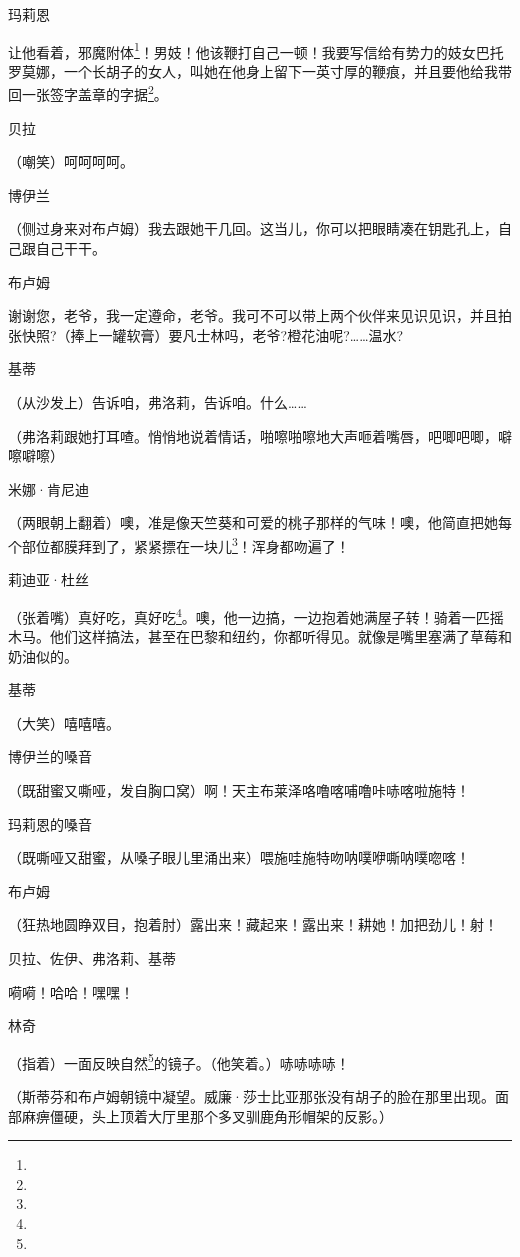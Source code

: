 \par 玛莉恩
\par 让他看着，邪魔附体\footnote{}！男妓！他该鞭打自己一顿！我要写信给有势力的妓女巴托罗莫娜，一个长胡子的女人，叫她在他身上留下一英寸厚的鞭痕，并且要他给我带回一张签字盖章的字据\footnote{}。
\par 贝拉
\par （嘲笑）呵呵呵呵。
\par 博伊兰
\par （侧过身来对布卢姆）我去跟她干几回。这当儿，你可以把眼睛凑在钥匙孔上，自己跟自己干干。
\par 布卢姆
\par 谢谢您，老爷，我一定遵命，老爷。我可不可以带上两个伙伴来见识见识，并且拍张快照?（捧上一罐软膏）要凡士林吗，老爷?橙花油呢?……温水?
\par 基蒂
\par （从沙发上）告诉咱，弗洛莉，告诉咱。什么……
\par （弗洛莉跟她打耳喳。悄悄地说着情话，啪嚓啪嚓地大声咂着嘴唇，吧唧吧唧，噼嚓噼嚓）
\par 米娜·肯尼迪
\par （两眼朝上翻着）噢，准是像天竺葵和可爱的桃子那样的气味！噢，他简直把她每个部位都膜拜到了，紧紧摽在一块儿\footnote{}！浑身都吻遍了！
\par 莉迪亚·杜丝
\par （张着嘴）真好吃，真好吃\footnote{}。噢，他一边搞，一边抱着她满屋子转！骑着一匹摇木马。他们这样搞法，甚至在巴黎和纽约，你都听得见。就像是嘴里塞满了草莓和奶油似的。
\par 基蒂
\par （大笑）嘻嘻嘻。
\par 博伊兰的嗓音
\par （既甜蜜又嘶哑，发自胸口窝）啊！天主布莱泽咯噜喀哺噜咔哧喀啦施特！
\par 玛莉恩的嗓音
\par （既嘶哑又甜蜜，从嗓子眼儿里涌出来）喂施哇施特吻呐噗咿嘶呐噗唿喀！
\par 布卢姆
\par （狂热地圆睁双目，抱着肘）露出来！藏起来！露出来！耕她！加把劲儿！射！
\par 贝拉、佐伊、弗洛莉、基蒂
\par 嗬嗬！哈哈！嘿嘿！
\par 林奇
\par （指着）一面反映自然\footnote{}的镜子。（他笑着。）哧哧哧哧！
\par （斯蒂芬和布卢姆朝镜中凝望。威廉·莎士比亚那张没有胡子的脸在那里出现。面部麻痹僵硬，头上顶着大厅里那个多叉驯鹿角形帽架的反影。）
